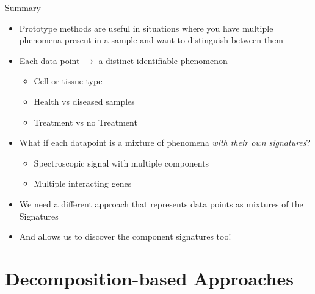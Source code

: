 \documentclass[aspectratio=169]{beamer}
\begin{document}
\begin{frame}{Summary}
  \begin{itemize}
    \item Prototype methods are useful in situations where you have multiple phenomena present in a sample and want to distinguish between them
    \item Each data point $\rightarrow$ a distinct identifiable phenomenon
    \begin{itemize}
      \item Cell or tissue type
      \item Health vs diseased samples
      \item Treatment vs no Treatment
    \end{itemize}
    \item What if each datapoint is a mixture of phenomena \textit{with their own signatures}?
    \begin{itemize}
      \item Spectroscopic signal with multiple components
      \item Multiple interacting genes
    \end{itemize}
    \item We need a different approach that represents data points as mixtures of the Signatures
    \item And allows us to discover the component signatures too!
  \end{itemize}
\end{frame}


\section{Decomposition-based Approaches}
\end{document}
